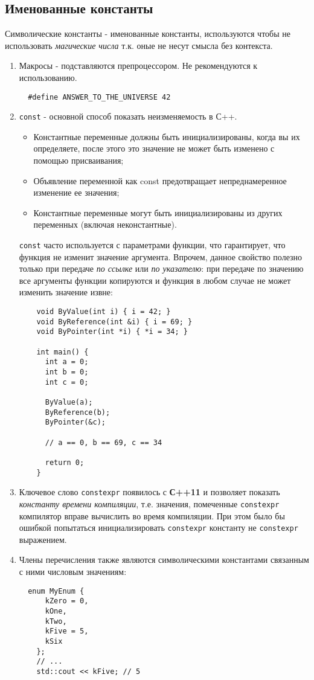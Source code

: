 \subsection{Именованные константы}
  
Символические константы - именованные константы, используются чтобы не
использовать \emph{магические числа} т.к. оные не несут смысла без
контекста.

\begin{enumerate}
\item
  Макросы - подставляются препроцессором. Не рекомендуются к
  использованию.

\begin{verbatim}
  #define ANSWER_TO_THE_UNIVERSE 42
\end{verbatim}
\item
  \texttt{const} - основной способ показать неизменяемость в С++.

  \begin{itemize}
  \item
    Константные переменные должны быть инициализированы, когда вы их
    определяете, после этого это значение не может быть изменено с
    помощью присваивания;
  \item
    Объявление переменной как const предотвращает непреднамеренное
    изменение ее значения;
  \item
    Константные переменные могут быть инициализированы из других
    переменных (включая неконстантные).
  \end{itemize}

  \texttt{const} часто используется с параметрами функции, что
  гарантирует, что функция не изменит значение аргумента. Впрочем,
  данное свойство полезно только при передаче \emph{по ссылке} или
  \emph{по указателю}: при передаче по значению все аргументы функции
  копируются и функция в любом случае не может изменить значение извне:
  \begin{verbatim}
    void ByValue(int i) { i = 42; }
    void ByReference(int &i) { i = 69; }
    void ByPointer(int *i) { *i = 34; }

    int main() {
      int a = 0;
      int b = 0;
      int c = 0;

      ByValue(a);
      ByReference(b);
      ByPointer(&c);

      // a == 0, b == 69, c == 34

      return 0;
    }
  \end{verbatim}
\item
  Ключевое слово \texttt{constexpr} появилось с \textbf{С++11} и
  позволяет показать \emph{константу времени компиляции}, т.е. значения,
  помеченные \texttt{constexpr} компилятор вправе вычислить во время
  компиляции. При этом было бы ошибкой попытаться инициализировать
  \texttt{constexpr} константу не \texttt{constexpr} выражением.
\item
  Члены перечисления также являются символическими константами связанным
  с ними числовым значениям:

\begin{verbatim}
  enum MyEnum {
      kZero = 0,
      kOne,
      kTwo,
      kFive = 5,
      kSix
    };
    // ...
    std::cout << kFive; // 5
\end{verbatim}
\end{enumerate}
